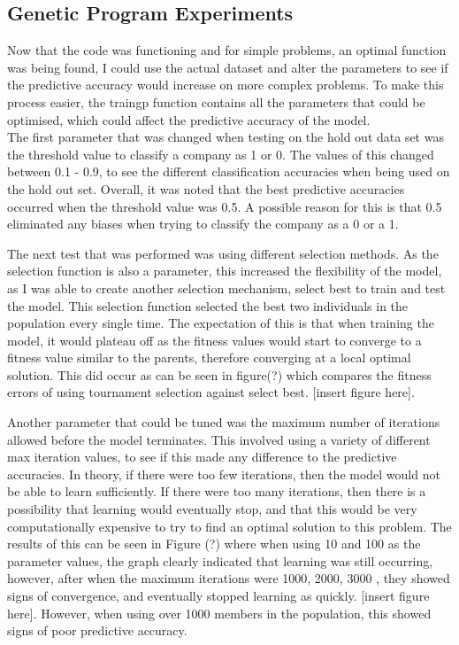 \documentclass[11pt]{article}
\begin{document}
\subsection{Genetic Program Experiments}
Now that the code was functioning and for simple problems, an optimal function was being found, I could use the actual dataset and alter the parameters to see if the predictive accuracy would increase on more complex problems. To make this process easier, the train\textunderscore gp function contains all the parameters that could be optimised, which could affect the predictive accuracy of the model. \\

The first parameter that was changed when testing on the hold out data set was the threshold value to classify a company as 1 or 0. The values of this changed between 0.1 - 0.9, to see the different classification accuracies when being used on the hold out set. Overall, it was noted that the best predictive accuracies occurred when the threshold value was 0.5. A possible reason for this is that 0.5 eliminated any biases when trying to classify the company as a 0 or a 1.

The next test that was performed was using different selection methods. As the selection function is also a parameter, this increased the flexibility of the model, as I was able to create another selection mechanism, select best to train and test the model. This selection function selected the best two individuals in the population every single time. The expectation of this is that when training the model, it would plateau off as the fitness values would start to converge to a fitness value similar to the parents, therefore converging at a local optimal solution. This did occur as can be seen in figure(?) which compares the fitness errors of using tournament selection against select best. [insert figure here].

Another parameter that could be tuned was the maximum number of iterations allowed before the model terminates. This involved using a variety of different max iteration values, to see if this made any difference to the predictive accuracies. In theory, if there were too few iterations, then the model would not be able to learn sufficiently. If there were too many iterations, then there is a possibility that learning would eventually stop, and that this would be very computationally expensive to try to find an optimal solution to this problem. The results of this can be seen in Figure (?) where when using 10 and 100 as the parameter values, the graph clearly indicated that learning was still occurring, however, after when the maximum iterations were 1000, 2000, 3000 , they showed signs of convergence, and eventually stopped learning as quickly. [insert figure here]. However, when using over 1000 members in the population, this showed signs of poor predictive accuracy.
\end{document}
